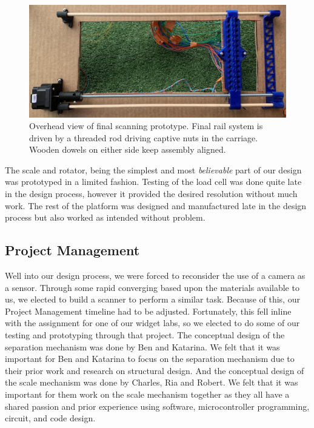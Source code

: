 \documentclass[12pt]{article}
\begin{document}
\begin{multicols*}{2}
            \begin{figure}[H]
                \centering\includegraphics[width=\linewidth]{CarriageV2.png}
                \captionsetup{width=\linewidth}
                \caption{Overhead view of final scanning prototype. Final rail system is driven by a threaded rod driving captive nuts in the carriage. Wooden dowels on either side keep assembly aligned.}
                \label{fig:OverheadV2}
            \end{figure}

            The scale and rotator, being the simplest and most \textit{believable} part of our design was prototyped in a limited fashion. Testing of the load cell was done quite late in the design process, however it provided the desired resolution without much work. The rest of the platform was designed and manufactured late in the design process but also worked as intended without problem.

        \subsection{Project Management}

        Well into our design process, we were forced to reconsider the use of a camera as a sensor. Through some rapid converging based upon the materials available to us, we elected to build a scanner to perform a similar task. Because of this, our Project Management timeline had to be adjusted. Fortunately, this fell inline with the assignment for one of our widget labs, so we elected to do some of our testing and prototyping through that project. The conceptual design of the separation mechanism was done by Ben and Katarina. We felt that it was important for Ben and Katarina to focus on the separation mechanism due to their prior work and research on structural design. And the conceptual design of the scale mechanism was done by Charles, Ria and Robert. We felt that it was important for them work on the scale mechanism together as they all have a shared passion and prior experience using software, microcontroller programming, circuit, and code design. 
        

\end{multicols*}
\end{document}
